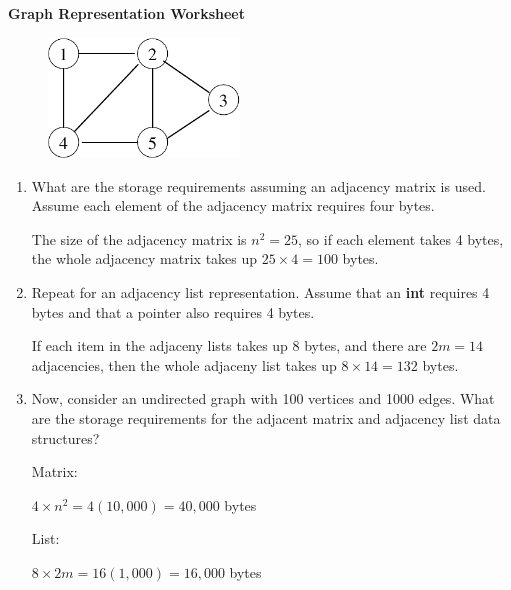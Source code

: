 \documentclass[12pt]{article}
\newcommand{\lsp}[1]{\large\renewcommand{\baselinestretch}{#1}\normalsize}
\begin{document}
\lsp{1}
\pagestyle{plain}
\begin{center}
{\bf
Graph Representation Worksheet
}
\end{center}

\begin{figure}[h]
\center{}
\includegraphics[width = 2in]{adjacency.pdf}
\end{figure}

\begin{enumerate}
\item What are the storage requirements assuming an adjacency matrix
is used. Assume each element of the adjacency matrix requires four 
bytes.

The size of the adjacency matrix is $n^2 = 25$, so if each element takes
4 bytes, the whole adjacency matrix takes up $25 \times 4 = 100$ bytes.

\vspace*{.25in}

\item Repeat for an adjacency list representation. Assume that an 
{\bf int} requires 4 bytes and that a pointer also requires 4 bytes.

If each item in the adjaceny lists takes up 8 bytes, and there are $2m = 14$
adjacencies, then the whole adjaceny list takes up $8 \times 14 = 132$
bytes.

\vspace*{.25in}

\item Now, consider an undirected graph with 100 vertices and 1000 edges. 
What are the storage requirements for the adjacent matrix and adjacency
list data structures?

Matrix:

$4 \times n^2 = 4(10,000) = 40,000$ bytes

List:

$8 \times 2m = 16(1,000) = 16,000$ bytes
 
\end{enumerate}
 
\end{document}
